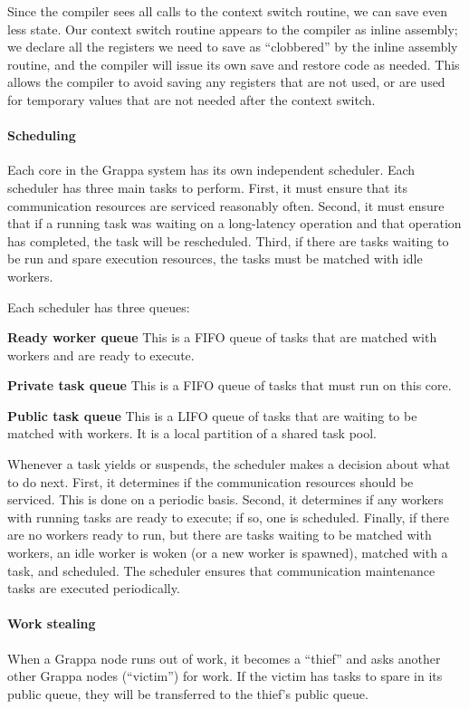 Since the compiler sees all calls to the context switch routine, we
can save even less state. Our context switch routine appears to the
compiler as inline assembly; we declare all the registers we need
to save as ``clobbered'' by the inline assembly routine, and the
compiler will issue its own save and restore code as needed. This allows the
compiler to avoid saving any registers that are not used, or are used
for temporary values that are not needed after the context switch.

\paragraph{Scheduling} Each core in the Grappa system has its own
independent scheduler. Each scheduler has three main tasks to perform. 
First, it must ensure that its communication resources are serviced
reasonably often. Second, it must ensure that if a running task was
waiting on a long-latency operation and that operation has completed,
the task will be rescheduled. Third, if there are tasks waiting to be
run and spare execution resources, the tasks must be matched with idle
workers.

Each scheduler has three queues:
\begin{description}
\item{\bf Ready worker queue} This is a FIFO queue of tasks that are
  matched with workers and are ready to execute.
\item{\bf Private task queue} This is a FIFO queue of tasks that must run on this core.
\item{\bf Public task queue} This is a LIFO queue of tasks that are
  waiting to be matched with workers. It is a local partition of a shared
  task pool.
\end{description}

Whenever a task yields or suspends, the scheduler makes a decision about
what to do next. First, it determines if the communication resources
should be serviced. This is done on a periodic basis. Second, it
determines if any workers with running tasks are ready to execute; if
so, one is scheduled. Finally, if there are no workers ready to run, but
there are tasks waiting to be matched with workers, an idle worker is
woken (or a new worker is spawned), matched with a task, and scheduled.
The scheduler ensures that communication maintenance tasks are executed periodically.

\paragraph{Work stealing} When a Grappa node runs out of work, it
becomes a ``thief'' and asks another other Grappa nodes (``victim'') for
work. If the victim has tasks to spare in its public queue, they will be
transferred to the thief's public queue.

